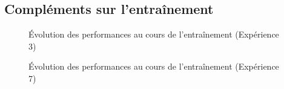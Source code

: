 
\subsection{Compléments sur l'entraînement}

\begin{figure}[h]
    \centering
    \caption{Évolution des performances au cours de l'entraînement (Expérience 3)}
    \label{fig:valid_exp3}
\end{figure}

\begin{figure}[h]
    \centering
    \caption{Évolution des performances au cours de l'entraînement (Expérience 7)}
    \label{fig:valid_exp7}
\end{figure}
